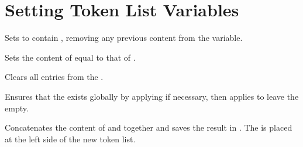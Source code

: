 \documentclass[oneside]{book}
\begin{document}
\section{Setting Token List Variables}

\begin{function}{\TlSet}
\begin{syntax}
  
\end{syntax}
Sets  to contain ,
removing any previous content from the variable.
\begin{demohigh}
\TlSet {}
\TlUse \lTmpiTl
\end{demohigh}
\end{function}

\begin{function}{\TlSetEq}
\begin{syntax}
  
\end{syntax}
Sets the content of  equal to that of .
\begin{demohigh}
\TlSet {}
\TlSetEq \lTmpbTl \lTmpaTl
\TlUse \lTmpbTl
\end{demohigh}
\end{function}

\begin{function}{\TlClear}
\begin{syntax}
 
\end{syntax}
Clears all entries from the .
\begin{demohigh}
\TlSet {}
\TlClear \lTmpjTl
\TlSet {}
\TlUse \lTmpjTl
\end{demohigh}
\end{function}

\begin{function}{\TlClearNew}
\begin{syntax}
 
\end{syntax}
Ensures that the  exists globally by applying
 if necessary, then applies  to leave
the  empty.
\begin{codehigh}
\TlClearNew \lFooSomeTl
\end{codehigh}
\end{function}

\begin{function}{\TlConcat}
\begin{syntax}
   
\end{syntax}
Concatenates the content of  and 
together and saves the result in . The 
is placed at the left side of the new token list.
\begin{demohigh}
\TlSet {}
\TlSet {}
\TlConcat \lTmpaTl \lTmpbTl \lTmpcTl
\TlUse \lTmpaTl
\end{demohigh}
\end{function}
\end{document}

